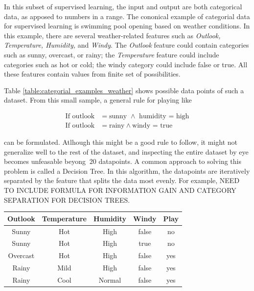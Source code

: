 In this subset of supervised learning, the input and output are both categorical data, as apposed to numbers in a range. The cononical example of categorial data for supervised learning is swimming pool opening based on weather conditions. In this example, there are several weather-related features such as \textit{Outlook, Temperature, Humidity,} and \textit{Windy}. The \textit{Outlook} feature could contain categories such as sunny, overcast, or rainy; the \textit{Temperature} feature could include categories such as hot or cold; the windy category could include false or true. All these features contain values from finite set of possibilities. 



Table \ref{table:categorial_examples_weather} shows possible data points of such a dataset. From this small sample, a general rule for playing like 

\begin{align*}
  	\textrm{If outlook}&=\textrm{sunny } \wedge \textrm{ humidity = high} \\
	\textrm{If outlook}&= \textrm{rainy} \wedge \textrm{windy = true}
\end{align*}

can be formulated. Atlhough this might be a good rule to follow, it might not generalize well to the rest of the dataset, and inspecting the entire dataset by eye becomes unfeasable beyong $~20$ datapoints. A common approach to solving this problem is called a Decision Tree. In this algorithm, the datapoints are iteratively separated by the feature that splits the data most evenly. For example,
NEED TO INCLUDE FORMULA FOR INFORMATION GAIN AND CATEGORY SEPARATION FOR DECISION TREES.
\begin{center}
 \label{table:categorial_examples_weather}
 \begin{tabular}{||c c c c c||} 
 \hline
 Outlook & Temperature & Humidity & Windy & Play \\ [0.5ex] 
 \hline\hline
 Sunny & Hot & High & false  & no\\ 
 \hline
 Sunny & Hot & High & true  & no\\ 
 \hline
 Overcast & Hot & High & false  & yes\\ 
 \hline
 Rainy & Mild & High & false  & yes\\ 
 \hline
 Rainy & Cool & Normal & false  & yes\\ [1ex] 
 \hline
\end{tabular}
\end{center}


